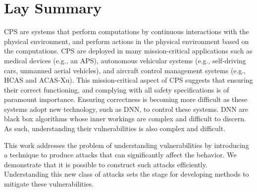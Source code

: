 

\chapter{Lay Summary}

\ac{CPS} are systems that perform computations by continuous interactions with the physical environment, and perform actions in the physical environment based on the computations. 
\ac{CPS} are deployed in many mission-critical applications such as medical devices (e.g., an \ac{APS}), autonomous vehicular systems (e.g., self-driving cars, unmanned aerial vehicles), and aircraft control management systems (e.g.,  \ac{HCAS} and \ac{ACAS-Xu}). 
This mission-critical aspect of CPS suggests that ensuring their correct functioning, and complying with all safety specifications is of paramount importance. 
Ensuring correctness is becoming more difficult as these systems adopt new technology, such as \ac{DNN}, to control these systems. 
\ac{DNN} are black box algorithms whose inner workings are complex and difficult to discern.
As such, understanding their vulnerabilities is also complex and difficult. 

This work addresses the problem of understanding vulnerabilities by introducing a  technique to produce attacks that can significantly affect the behavior. 
We demonstrate that it is possible  to construct such attacks efficiently. 
Understanding this new class of attacks sets the stage for developing methods to mitigate these vulnerabilities. 



 



